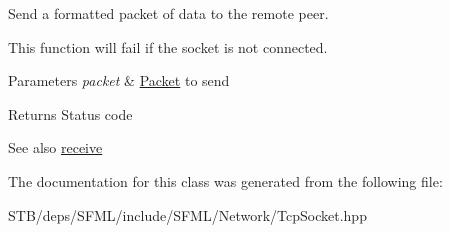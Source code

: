 Send a formatted packet of data to the remote peer. 

This function will fail if the socket is not connected.


\begin{DoxyParams}{Parameters}
{\em packet} & \hyperlink{classsf_1_1_packet}{Packet} to send\\
\hline
\end{DoxyParams}
\begin{DoxyReturn}{Returns}
Status code
\end{DoxyReturn}
\begin{DoxySeeAlso}{See also}
\hyperlink{classsf_1_1_tcp_socket_a90ce50811ea61d4f00efc62bb99ae1af}{receive} 
\end{DoxySeeAlso}


The documentation for this class was generated from the following file\+:\begin{DoxyCompactItemize}
\item 
S\+T\+B/deps/\+S\+F\+M\+L/include/\+S\+F\+M\+L/\+Network/Tcp\+Socket.\+hpp\end{DoxyCompactItemize}

